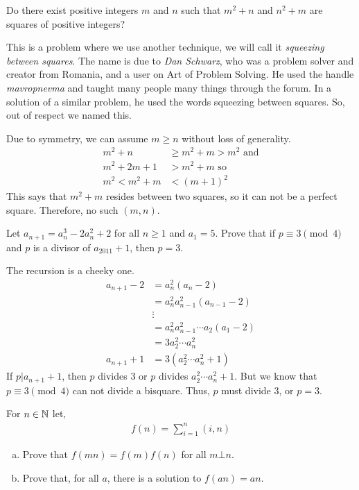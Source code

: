 \documentclass[problems.tex]{subfile}
\begin{document}
	\begin{problem}[Croatia $2014$]
		Do there exist positive integers $m$ and $n$ such that $m^2+n$ and $n^2+m$ are squares of positive integers?
	\end{problem}
	
This is a problem where we use another technique, we will call it \textit{squeezing between squares}. The name is due to \textit{Dan Schwarz}, who was a problem solver and creator from Romania, and a user on Art of Problem Solving. He used the handle \textit{mavropnevma} and taught many people many things through the forum. In a solution of a similar problem, he used the words squeezing between squares. So, out of respect we named this.
	\begin{solution}
		Due to symmetry, we can assume $m\geq n$ without loss of generality.
			\begin{align*}
				m^2+n & \geq m^2+m>m^2\text { and}\\
				m^2+2m+1 &> m^2+m\text { so}\\
				m^2 < m^2+m&<(m+1)^2
			\end{align*}
		This says that $m^2+m$ resides between two squares, so it can not be a perfect square. Therefore, no such $(m,n)$.
	\end{solution}
	
	\begin{problem}[Turkey $2011$]
		Let $a_{n+1}=a_n^3-2a_n^2+2$ for all $n\geq1$ and $a_1=5$. Prove that if $p\equiv3\pmod4$ and $p$ is a divisor of $a_{2011}+1$, then $p=3$.
	\end{problem}
	
	\begin{solution}
		The recursion is a cheeky one.	
			\begin{align*}
				a_{n+1}-2 & = a_n^2(a_n-2)\\
						  & = a_n^2a_{n-1}^2(a_{n-1}-2)\\
						  & \vdots\\
						  & = a_n^2a_{n-1}^2\cdots a_2(a_1-2)\\
						  & = 3a_2^2\cdots a_n^2\\
				a_{n+1}+1 & = 3(a_2^2\cdots a_n^2+1)
			\end{align*}
		If $p|a_{n+1}+1$, then $p$ divides $3$ or $p$ divides $a_2^2\cdots a_n^2+1$. But we know that $p\equiv3\pmod4$ can not divide a bisquare. Thus, $p$ must divide $3$, or $p=3$.
	\end{solution}
	
	\begin{problem}
		For $n\in\mathbb{N} $ let,
			\begin{align*}
				f(n)=\sum\limits_{i=1}^n(i,n)
			\end{align*}
			
			\begin{enumerate}[(a)]
				\item Prove that $f(mn)=f(m)f(n)$ for all $m\bot n$.
				\item Prove that, for all $a$, there is a solution to $f(an)=an$.
			\end{enumerate}
	\end{problem}
	
\end{document}
